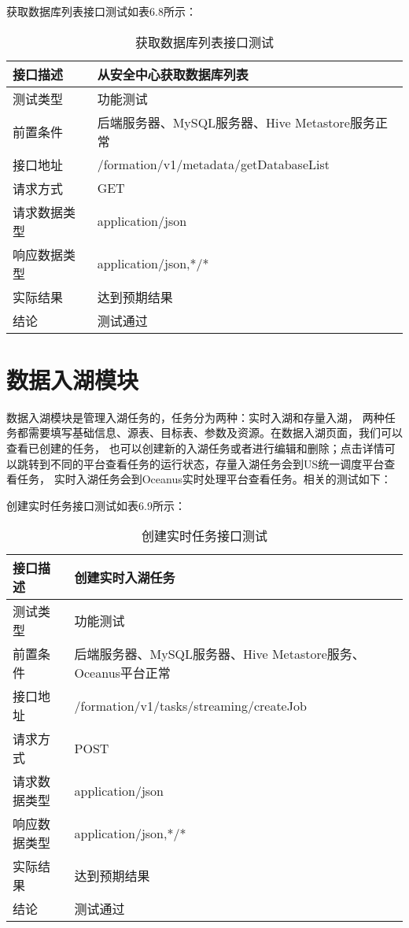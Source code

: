 获取数据库列表接口测试如表6.8所示：

\begin{table}[h]
  \centering
  \caption{获取数据库列表接口测试}
  \label{tab:exampletable}
  \begin{tabular}{ll}
    \toprule
    接口描述         & 从安全中心获取数据库列表         \\
    \midrule
    测试类型         & 功能测试         \\
    前置条件         & 后端服务器、MySQL服务器、Hive Metastore服务正常         \\
    接口地址       & /formation/v1/metadata/getDatabaseList        \\
    请求方式         & GET      \\
    请求数据类型         & application/json     \\
    响应数据类型         & application/json,*/*           \\
    实际结果         & 达到预期结果           \\
    结论            & 测试通过           \\
    \bottomrule
  \end{tabular}
\end{table}

\section{数据入湖模块}

数据入湖模块是管理入湖任务的，任务分为两种：实时入湖和存量入湖，
两种任务都需要填写基础信息、源表、目标表、参数及资源。在数据入湖页面，我们可以查看已创建的任务，
也可以创建新的入湖任务或者进行编辑和删除；点击详情可以跳转到不同的平台查看任务的运行状态，存量入湖任务会到US统一调度平台查看任务，
实时入湖任务会到Oceanus实时处理平台查看任务。相关的测试如下：

创建实时任务接口测试如表6.9所示：

\begin{table}[h]
  \centering
  \caption{创建实时任务接口测试}
  \label{tab:exampletable}
  \begin{tabular}{ll}
    \toprule
    接口描述         & 创建实时入湖任务         \\
    \midrule
    测试类型         & 功能测试         \\
    前置条件         & 后端服务器、MySQL服务器、Hive Metastore服务、Oceanus平台正常         \\
    接口地址       & /formation/v1/tasks/streaming/createJob        \\
    请求方式         & POST      \\
    请求数据类型         & application/json     \\
    响应数据类型         & application/json,*/*           \\
    实际结果         & 达到预期结果           \\
    结论            & 测试通过           \\
    \bottomrule
  \end{tabular}
\end{table}

